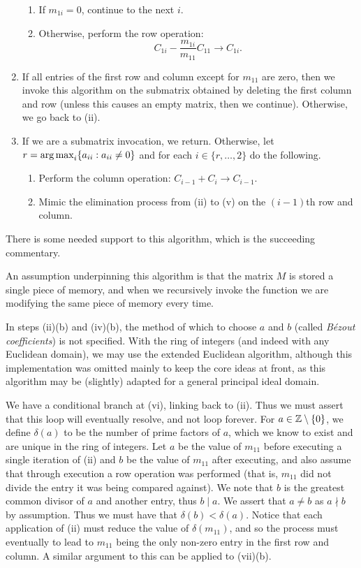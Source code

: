 \begin{algorithm}
\begin{enumerate}
		\begin{enumerate}
			\item If $m_{1i} = 0$, continue to the next $i$.
			\item Otherwise, perform the row operation:
				\[ C_{1i} -\frac{m_{1i}}{m_{11}} C_{11} \to C_{1i}. \]
		\end{enumerate}
		\item If all entries of the first row and column except for $m_{11}$ are zero, then we invoke this algorithm on the submatrix obtained by deleting the first column and row (unless this causes an empty matrix, then we continue). Otherwise, we go back to (ii).
		\item If we are a submatrix invocation, we return. Otherwise, let $r = \operatorname*{arg\,max}_i\{a_{ii}: a_{ii} \neq 0\}$ and for each $i \in \{r, \ldots, 2\}$ do the following.
		\begin{enumerate}
			\item Perform the column operation: $C_{i-1} + C_{i} \to C_{i-1}$.
			\item Mimic the elimination process from (ii) to (v) on the $(i-1)$th row and column.
		\end{enumerate}
	\end{enumerate}
\end{algorithm}

There is some needed support to this algorithm, which is the succeeding commentary.

An assumption underpinning this algorithm is that the matrix $M$ is stored a single piece of memory, and when we recursively invoke the function we are modifying the same piece of memory every time.

In steps (ii)(b) and (iv)(b), the method of which to choose $a$ and $b$ (called \emph{B\'ezout coefficients}) is not specified. With the ring of integers (and indeed with any Euclidean domain), we may use the extended Euclidean algorithm, although this implementation was omitted mainly to keep the core ideas at front, as this algorithm may be (slightly) adapted for a general principal ideal domain.

We have a conditional branch at (vi), linking back to (ii). Thus we must assert that this loop will eventually resolve, and not loop forever. For $a \in \mathbb{Z} \setminus \{0\}$, we define $\delta(a)$ to be the number of prime factors of $a$, which we know to exist and are unique in the ring of integers. Let $a$ be the value of $m_{11}$ before executing a single iteration of (ii) and $b$ be the value of $m_{11}$ after executing, and also assume that through execution a row operation was performed (that is, $m_{11}$ did not divide the entry it was being compared against). We note that $b$ is the greatest common divisor of $a$ and another entry, thus $b \mid a$. We assert that $a \neq b$ as $a \nmid b$ by assumption. Thus we must have that $\delta(b) < \delta(a)$. Notice that each application of (ii) must reduce the value of $\delta(m_{11})$, and so the process must eventually to lead to $m_{11}$ being the only non-zero entry in the first row and column. A similar argument to this can be applied to (vii)(b).

